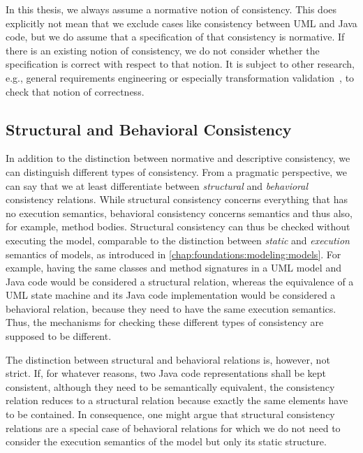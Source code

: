In this thesis, we always assume a normative notion of consistency.
This does explicitly not mean that we exclude cases like consistency between \gls{UML} and Java code, but we do assume that a specification of that consistency is normative.
If there is an existing notion of consistency, we do not consider whether the specification is correct with respect to that notion.
It is subject to other research, e.g., general requirements engineering or especially transformation validation~\cite{add}, to check that notion of correctness.



\subsection{Structural and Behavioral Consistency}
\label{chap:networks:notions:types}

In addition to the distinction between normative and descriptive consistency, we can distinguish different types of consistency.
From a pragmatic perspective, we can say that we at least differentiate between \emph{structural} and \emph{behavioral} consistency relations.
While structural consistency concerns everything that has no execution semantics, behavioral consistency concerns semantics and thus also, for example, method bodies.
Structural consistency can thus be checked without executing the model, comparable to the distinction between \emph{static} and \emph{execution} semantics of models, as introduced in \autoref{chap:foundations:modeling:models}.
For example, having the same classes and method signatures in a \gls{UML} model and Java code would be considered a structural relation, whereas the equivalence of a \gls{UML} state machine and its Java code implementation would be considered a behavioral relation, because they need to have the same execution semantics.
Thus, the mechanisms for checking these different types of consistency are supposed to be different.

The distinction between structural and behavioral relations is, however, not strict.
If, for whatever reasons, two Java code representations shall be kept consistent, although they need to be semantically equivalent, the consistency relation reduces to a structural relation because exactly the same elements have to be contained.
In consequence, one might argue that structural consistency relations are a special case of behavioral relations for which we do not need to consider the execution semantics of the model but only its static structure.

